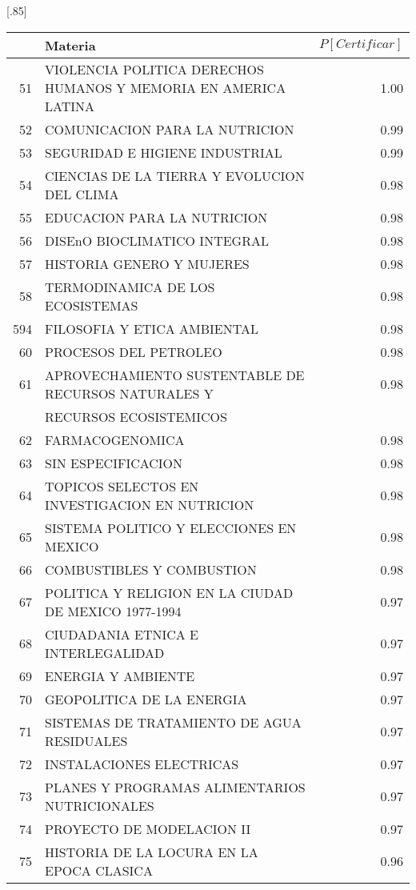 \documentclass[12pt]{article}
\begin{document}
\begin{table}[ht]
\centering
\scalebox{0.75}[.85]{
\begin{tabular}{rlr}
  \hline
 & Materia & $P[Certificar]$  \\ 
  \hline 
  51 & VIOLENCIA POLITICA DERECHOS HUMANOS Y MEMORIA EN AMERICA LATINA & 1.00 \\ 
  52 & COMUNICACION PARA LA NUTRICION & 0.99 \\ 
  53 & SEGURIDAD E HIGIENE INDUSTRIAL & 0.99 \\ 
  54 & CIENCIAS DE LA TIERRA Y EVOLUCION DEL CLIMA & 0.98 \\ 
    55 & EDUCACION PARA LA NUTRICION & 0.98 \\ 
  56 & DISEnO BIOCLIMATICO INTEGRAL & 0.98 \\ 
  57 & HISTORIA GENERO Y MUJERES & 0.98 \\ 
  58 & TERMODINAMICA DE LOS ECOSISTEMAS & 0.98 \\ 
  594 & FILOSOFIA Y ETICA AMBIENTAL & 0.98 \\ 
  60 & PROCESOS DEL PETROLEO & 0.98 \\ 
  61 & APROVECHAMIENTO SUSTENTABLE DE RECURSOS NATURALES Y & 0.98 \\ 
  & RECURSOS ECOSISTEMICOS & \\ 
  62 & FARMACOGENOMICA & 0.98 \\ 
  63 & SIN ESPECIFICACION & 0.98 \\ 
  64 & TOPICOS SELECTOS EN INVESTIGACION EN NUTRICION & 0.98 \\ 
  65 & SISTEMA POLITICO Y ELECCIONES EN MEXICO & 0.98 \\ 
  66 & COMBUSTIBLES Y COMBUSTION & 0.98 \\ 
  67 & POLITICA Y RELIGION EN LA CIUDAD DE MEXICO 1977-1994 & 0.97 \\ 
  68 & CIUDADANIA ETNICA E INTERLEGALIDAD & 0.97 \\ 
  69 & ENERGIA Y AMBIENTE & 0.97 \\ 
  70 & GEOPOLITICA DE LA ENERGIA & 0.97 \\ 
  71 & SISTEMAS DE TRATAMIENTO DE AGUA RESIDUALES & 0.97 \\ 
  72 & INSTALACIONES ELECTRICAS & 0.97 \\ 
  73 & PLANES Y PROGRAMAS ALIMENTARIOS NUTRICIONALES & 0.97 \\ 
  74 & PROYECTO DE MODELACION II & 0.97 \\ 
  75 & HISTORIA DE LA LOCURA EN LA EPOCA CLASICA & 0.96 \\ 

\end{tabular}}
\end{table}
\end{document}
